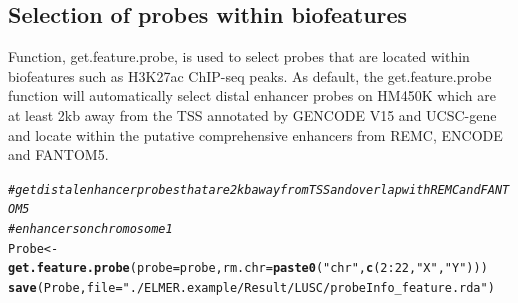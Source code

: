 \documentclass{article}\usepackage[]{graphicx}\usepackage[]{color}
\makeatletter
\newcommand{\hlnum}[1]{\textcolor[rgb]{0.686,0.059,0.569}{#1}}%
\newcommand{\hlstr}[1]{\textcolor[rgb]{0.192,0.494,0.8}{#1}}%
\newcommand{\hlcom}[1]{\textcolor[rgb]{0.678,0.584,0.686}{\textit{#1}}}%
\newcommand{\hlopt}[1]{\textcolor[rgb]{0,0,0}{#1}}%
\newcommand{\hlstd}[1]{\textcolor[rgb]{0.345,0.345,0.345}{#1}}%
\newcommand{\hlkwb}[1]{\textcolor[rgb]{0.69,0.353,0.396}{#1}}%
\newcommand{\hlkwc}[1]{\textcolor[rgb]{0.333,0.667,0.333}{#1}}%
\newcommand{\hlkwd}[1]{\textcolor[rgb]{0.737,0.353,0.396}{\textbf{#1}}}%
\newenvironment{kframe}{%
 \def\at@end@of@kframe{}%
 \ifinner\ifhmode%
  \def\at@end@of@kframe{\end{minipage}}%
  \begin{minipage}{\columnwidth}%
 \fi\fi%
 \def\FrameCommand##1{\hskip\@totalleftmargin \hskip-\fboxsep
 \colorbox{shadecolor}{##1}\hskip-\fboxsep
     \hskip-\linewidth \hskip-\@totalleftmargin \hskip\columnwidth}%
 \MakeFramed {\advance\hsize-\width
   \@totalleftmargin\z@ \linewidth\hsize
   \@setminipage}}%
 {\par\unskip\endMakeFramed%
 \at@end@of@kframe}
\newenvironment{knitrout}{}{} %
\makeatother
\begin{document}
\subsection{Selection of probes within biofeatures}
Function, get.feature.probe, is used to select probes that are located within 
biofeatures such as H3K27ac ChIP-seq peaks. As default, the get.feature.probe function
will automatically select distal enhancer probes on HM450K which are at least 
2kb away from the TSS annotated by GENCODE V15 and UCSC-gene and locate within 
the putative comprehensive enhancers from REMC, ENCODE and FANTOM5. 
\begin{knitrout}
\color{fgcolor}\begin{kframe}
\begin{alltt}
\hlcom{#get distal enhancer probes that are 2kb away from TSS and overlap with REMC and FANTOM5 }
\hlcom{#enhancers on chromosome 1}
\hlstd{Probe} \hlkwb{<-} \hlkwd{get.feature.probe}\hlstd{(}\hlkwc{probe}\hlstd{=probe,} \hlkwc{rm.chr}\hlstd{=}\hlkwd{paste0}\hlstd{(}\hlstr{"chr"}\hlstd{,}\hlkwd{c}\hlstd{(}\hlnum{2}\hlopt{:}\hlnum{22}\hlstd{,}\hlstr{"X"}\hlstd{,}\hlstr{"Y"}\hlstd{)))}
\hlkwd{save}\hlstd{(Probe,}\hlkwc{file}\hlstd{=}\hlstr{"./ELMER.example/Result/LUSC/probeInfo_feature.rda"}\hlstd{)}
\end{alltt}
\end{kframe}
\end{knitrout}
\end{document}
